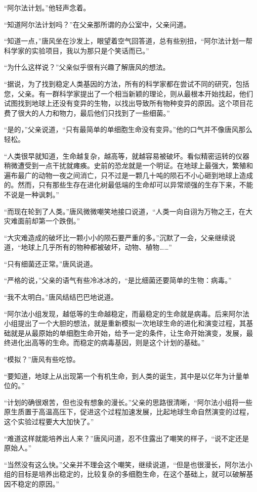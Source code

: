 “阿尔法计划。”他轻声念着。

“知道阿尔法计划吗？”在父亲那所谓的办公室中，父亲问道。

“知道一点，”唐风坐在沙发上，眼望着空气回答道，总有些别扭，“阿尔法计划一帮科学家的实验项目，我以为那只是个笑话而已。”

“为什么这样说？”父亲似乎很有兴趣了解唐风的想法。

“据说，为了找到稳定人类基因的方法，所有的科学家都在尝试不同的研究，包括您，父亲。有一群科学家提出了一个相当新颖的理论，则从最根本开始找起，他们试图找到地球上还没有变异的生物，以找出导致所有物种变异的原因。这个项目花费了很大的人力和物力，最后他们只找到了一些细菌。”

“是的，”父亲说道，“只有最简单的单细胞生命没有变异。”他的口气并不像唐风那么轻松。

“人类很早就知道，生命越复杂，越高等，就越容易被破坏。看似精密运转的仪器稍微遭受到一点干扰就瘫痪。史前的恐龙就是一个明证。在地球上最强大，繁殖和遍布最广的动物一夜之间消亡，只不过是一颗几十吨的陨石不小心砸到地球上造成的。然而，只有那些生存在进化树最低端的生命却可以异常顽强的生存下来，不能不说是一种讽刺。”

“而现在轮到了人类。”唐风微微嘲笑地接口说道，“人类一向自诩为万物之王，在大灾难面前却第一个跌倒。”

“大灾难造成的破坏比一颗小小的陨石要严重的多。”沉默了一会，父亲继续说道，“地球上几乎所有的物种都被破坏，动物、植物……”

“只有细菌还正常。”唐风说道。

“严格的说，”父亲的语气有些冷冰冰的，“是比细菌还要简单的生物：病毒。”

“我不太明白。”唐风结结巴巴地说道。

“阿尔法小组发现，越低等的生命越稳定，而最稳定的生命就是病毒。后来阿尔法小组提出了一个大胆的想法，就是重新模拟一次地球生命的进化和演变过程，其基础就是从最原始的单细胞生命开始，给予一定的条件，让生命开始演变，发展，最终进化出高等的生命。而稳定的病毒基因，则是这个计划的基础。”

“模拟？”唐风有些吃惊。

“要知道，地球上从出现第一个有机生命，到人类的诞生，其中是以亿年为计量单位的。”

“计划的确很艰苦，但也没有想象的漫长。”父亲的思路很清晰，“阿尔法小组将一些原生质置于高温高压下，促进这个过程加速发展，比起地球生命自然演变的过程，这个实验过程要大大加快了。”

“难道这样就能培养出人来？”唐风问道，忍不住露出了嘲笑的样子，“说不定还是原始人。”

“当然没有这么快。”父亲并不理会这个嘲笑，继续说道，“但是也很漫长，阿尔法小组的目标是培养出稳定的，比较复杂的多细胞生命，在这个基础上，就可以破解基因不稳定的原因。”

